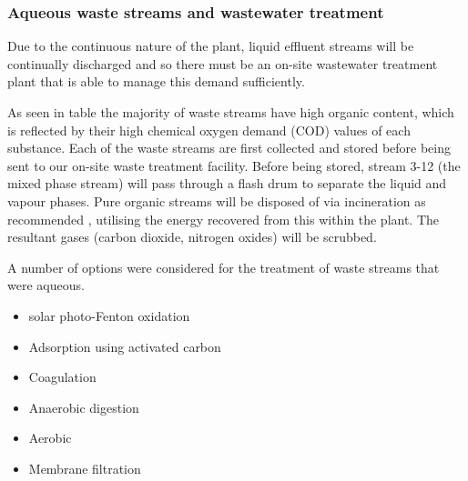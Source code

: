 
\subsubsection{Aqueous waste streams and wastewater treatment}

Due to the continuous nature of the plant, liquid effluent streams will be continually discharged and so there must be an on-site wastewater treatment plant that is able to manage this demand sufficiently.  %

As seen in table %
the majority of waste streams have high organic content, which is reflected by their high chemical oxygen demand (COD) values of each substance. Each of the waste streams are first collected and stored before being sent to our on-site waste treatment facility. Before being stored, stream 3-12 (the mixed phase stream) will pass through a flash drum to separate the liquid and vapour phases. Pure organic streams will be disposed of via incineration as recommended \cite{sinnott_coulson_2005}, utilising the energy recovered from this within the plant. The resultant gases (carbon dioxide, nitrogen oxides) will be scrubbed. 

A number of options were considered for the treatment of waste streams that were aqueous. 


\begin{itemize}
    \item solar photo-Fenton oxidation
    
    
    \item Adsorption using activated carbon
    
    
    
    
    
    \item Coagulation
    
    
    
    
    
    \item Anaerobic digestion
    
    
    
    
    
    
    \item Aerobic
    
    
    
    
    \item Membrane filtration
    
    
    
    
    
    
\end{itemize}

